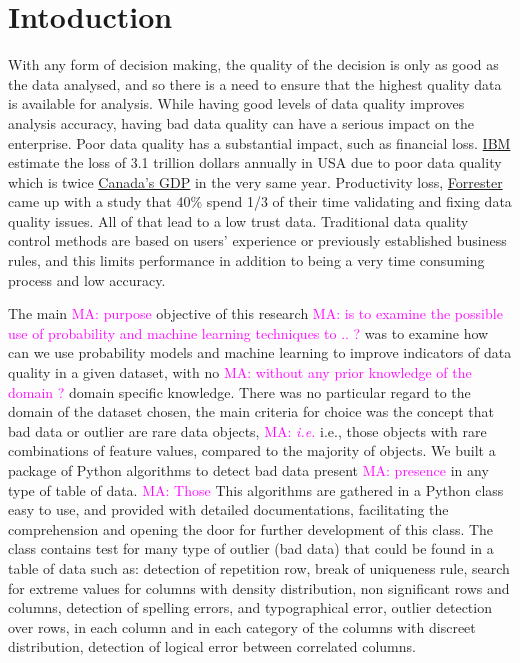 \documentclass{article}
\newcommand\mabaach[1]{\textcolor{magenta}{MA: #1}}
\begin{document}
\section{Intoduction} %
\label{sec:Intoduction}
With any form of decision making, the quality of the decision is only as good as the data analysed, and so there is a need to ensure that the highest quality data is available for analysis. While having good levels of data quality improves analysis accuracy, having bad data quality can have a serious impact on the enterprise.
Poor data quality has a substantial impact, such as financial loss.  \href{https://www.ibm.com/blogs/journey-to-ai/}{IBM} estimate the loss of 3.1 trillion dollars annually  in USA due to poor data quality which is twice \href{https://data.worldbank.org/indicator/NY.GDP.MKTP.CD}{Canada’s GDP} in the very same year. Productivity loss, \href{https://www.forrester.com/report/Build-Trusted-Data-With-Data-Quality/RES83344}{Forrester} came up with a study that 40\% spend 1/3 of their time validating and fixing data quality issues. All of that lead to a low trust data.
Traditional data quality control methods are based on users’ experience or previously established business rules, and this
limits performance in addition to being a very time consuming process and low accuracy.

The main \mabaach{purpose} objective of this research \mabaach{is to examine the possible use of probability and machine learning techniques to .. ?} was to examine how can we use
probability models and machine learning to improve indicators
of data quality in a given dataset, with no \mabaach{without any prior knowledge of the domain ?} domain specific knowledge.
There was no particular regard to the domain of the dataset chosen, the main criteria for choice was the concept that bad data or outlier are rare data objects, \mabaach{\textit{i.e.}} i.e., those objects with rare combinations of feature values, compared to the majority of objects.
We built a package of Python algorithms to detect bad data present \mabaach{presence} in any type of table of data. \mabaach{Those} This algorithms are gathered in a Python class easy to use, and provided with detailed documentations, facilitating the comprehension and opening the door for further development of this class. The class contains test for many type of outlier (bad data) that could be found in a table of data such as: detection of repetition row, break of uniqueness rule, search for extreme values for columns with density distribution, non significant rows and columns, detection of spelling errors, and typographical error, outlier detection over rows, in each column and in each category of the columns with discreet distribution, detection of logical error between correlated columns.
\end{document}
